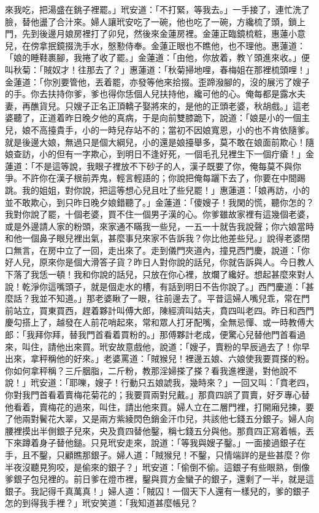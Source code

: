 \begin{showcontents}{}
來我吃，把湯盛在銚子裡罷。」玳安道：「不打緊，等我去。」一手接了，連忙洗了臉，替他盪了合汁來。婦人讓玳安吃了一碗，他也吃了一碗，方纔梳了頭，鎖上門，先到後邊月娘房裡打了卯兒，然後來金蓮房裡。金蓮正臨鏡梳粧，惠蓮小意兒，在傍拿抿鏡掇洗手水，慇懃侍奉。金蓮正眼也不瞧他，也不理他。惠蓮道：「娘的睡鞋裹腳，我捲了收了罷。」金蓮道：「由他，你放着，教丫頭進來收。」便叫秋菊：「賊奴才！往那去了？」惠蓮道：「秋菊掃地哩，春梅姐在那裡梳頭哩！」金蓮道：「你別要管他，丟着罷，亦發等他來拾掇。歪蹄潑腳的，沒的展污了嫂子的手。你去扶持你爹，爹也得你恁個人兒扶持他，纔可他的心。俺每都是露水夫妻，再醮貨兒。只嫂子正名正頂轎子娶將來的，是他的正頭老婆，秋胡戲。」這老婆聽了，正道着昨日晚夕他的真病，于是向前雙膝跪下，說道：「娘是小的一個主兒，娘不高擡貴手，小的一時兒存站不的；當初不因娘寬恩，小的也不肯依隨爹。就是後邊大娘，無過只是個大綱兒，小的還是娘擡舉多，莫不敢在娘面前欺心！隨娘查訪，小的但有一字欺心，到明日不逢好死，一個毛孔兒裡生下一個疔瘡！」金蓮道：「不是這等說，我眼子裡放不下砂子的人，漢子既要了你，俺每莫不與你爭。不許你在漢子根前弄鬼，輕言輕語的；你說把俺每躧下去了，你要在中間踢跳。我的姐姐，對你說，把這等想心兒且吐了些兒罷！」惠蓮道：「娘再訪，小的並不敢欺心，到只昨日晚夕娘錯聽了。」金蓮道：「傻嫂子！我閑的慌，聽你怎的？我對你說了罷，十個老婆，買不住一個男子漢的心。你爹雖故家裡有這幾個老婆，或是外邊請人家的粉頭，來家通不瞞我一些兒，一五一十就告我說聲；你六娘當時和他一個鼻子眼兒裡出氣，甚麼事兒來家不告訴我？你比他差些兒。」說得老婆閉口無言，在房中立了一回，走出來了。走到儀門夾道內，撞見西門慶，說道：「你好人兒，原來你是個大滑答子貨？昨日人對你說的話兒，你就告訴與人。今日教人下落了我恁一頓！我和你說的話兒，只放在你心裡，放爛了纔好。想起甚麼來對人說！乾淨你這嘴頭子，就是個走水的槽，有話到明日不告你說了。」西門慶道：「甚麼話？我並不知道。」那老婆瞅了一眼，往前邊去了。平昔這婦人嘴兒乖，常在門前站立，買東買西，趕着夥計叫傅大郎，陳經濟叫姑夫，賁四叫老四。昨日和西門慶勾搭上了，越發在人前花哨起來，常和眾人打牙配嘴，全無忌憚、或一時教傅大郎：「我拜你拜，替我門首看着買粉的。」那傅夥計老成，便驚心兒替他門首看過來，叫住，請他出來買。玳安故意戲他，說道：「嫂子，賣粉的早辰過去了！你早出來，拿秤稱他的好來。」老婆罵道：「賊猴兒！裡邊五娘、六娘使我要買搽的粉。你如何拿秤稱？三斤胭脂，二斤粉，教那淫婦搽了搽？看我進裡邊，對他說不說！」玳安道：「耶嚛，嫂子！行動只五娘諕我，幾時來？」一回又叫：「賁老四，你對我門首看着賣梅花菊花的；我要買兩對兒戴。」那賁四誤了買賣，好歹專心替他看着，賣梅花的過來，叫住，請出他來買。婦人立在二層門裡，打開廂兒揀，要了他兩對鬢花大翠，又是兩方紫綾閃色銷金汗巾兒，共該他七錢五分銀子。婦人向腰裡摸出半側銀子兒來，央及賁四替他鑿，稱七錢五分與他。那賁四正寫着帳，丟下來蹲着身子替他鎚。只見玳安走來，說道：「等我與嫂子鑿。」一面接過銀子在手，且不鑿，只顧瞧那銀子。婦人道：「賊猴兒！不鑿，只情端詳的是些甚麼？你半夜沒聽見狗咬，是偷來的銀子？」玳安道：「偷倒不偷。這銀子有些眼熟，倒像爹銀子包兒裡的。前日爹在燈市裡，鑿與買方金蠻子的銀子，還剩了一半，就是這銀子。我記得千真萬真！」婦人道：「賊囚！一個天下人還有一樣兒的，爹的銀子怎的到得我手裡？」玳安笑道：「我知道甚麼帳兒？
\end{showcontents}
